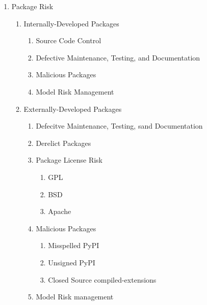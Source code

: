 \begin{enumerate}
        \item Package Risk
        \begin{enumerate}
                \item Internally-Developed Packages
                \begin{enumerate}
                        \item Source Code Control
                        \item Defective Maintenance, Testing, and Documentation
                        \item Malicious Packages
                        \item Model Risk Management
                \end{enumerate}
                \item Externally-Developed Packages
                \begin{enumerate}
                        \item Defecitve Maintenance, Testing, sand Documentation
                        \item Derelict Packages
                        \item Package License Risk
                        \begin{enumerate}
                                \item GPL
                                \item BSD
                                \item Apache
                        \end{enumerate}
                        \item Malicious Packages
                        \begin{enumerate}
                                \item Misspelled PyPI
                                \item Unsigned PyPI
                                \item Closed Source compiled-extensions
                        \end{enumerate}
                        \item Model Risk management
                \end{enumerate}
        \end{enumerate} %


\end{enumerate}
